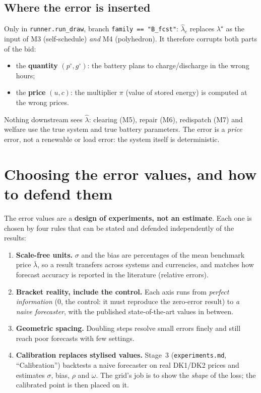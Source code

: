 \documentclass[10pt,a4paper]{article}
\newcommand{\code}[1]{\texttt{#1}}
\newcommand{\lamstar}{\lambda^{\star}}
\newcommand{\lamhat}{\hat\lambda}
\begin{document}
\subsection{Where the error is inserted}
Only in \code{runner.run\_draw}, branch \code{family == "B\_fcst"}: $\lamhat_e$ replaces $\lamstar$ as the
input of M3 (self-schedule) \emph{and} M4 (polyhedron). It therefore corrupts both parts of the bid:
\begin{itemize}
  \item the \textbf{quantity} $(p^\circ,g^\circ)$: the battery plans to charge/discharge in the wrong hours;
  \item the \textbf{price} $(u,c)$: the multiplier $\pi$ (value of stored energy) is computed at the wrong prices.
\end{itemize}
Nothing downstream sees $\lamhat$: clearing (M5), repair (M6), redispatch (M7) and welfare use the true
system and true battery parameters. The error is a \emph{price} error, not a renewable or load error: the
system itself is deterministic.

\section{Choosing the error values, and how to defend them}
\label{sec:values}

The error values are a \textbf{design of experiments, not an estimate}. Each one is chosen by four rules
that can be stated and defended independently of the results:
\begin{enumerate}
  \item \textbf{Scale-free units.} $\sigma$ and the bias are percentages of the mean benchmark price
    $\bar\lambda$, so a result transfers across systems and currencies, and matches how forecast accuracy is
    reported in the literature (relative errors).
  \item \textbf{Bracket reality, include the control.} Each axis runs from \emph{perfect information} (0, the
    control: it must reproduce the zero-error result) to \emph{a naive forecaster}, with the published
    state-of-the-art values in between.
  \item \textbf{Geometric spacing.} Doubling steps resolve small errors finely and still reach poor forecasts
    with few settings.
  \item \textbf{Calibration replaces stylised values.} Stage~3 (\code{experiments.md}, ``Calibration'') backtests
    a naive forecaster on real DK1/DK2 prices and estimates $\sigma$, bias, $\rho$ and $\omega$. The grid's job is
    to show the \emph{shape} of the loss; the calibrated point is then placed on it.
\end{enumerate}
\end{document}
